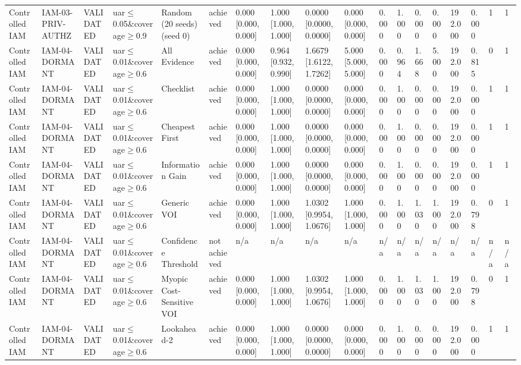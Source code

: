 \begin{table}[!ht]
{\begin{tabular}{llllllllllllllllll}
Controlled IAM & IAM-03-PRIV-AUTHZ & VALIDATED & uar$\le$0.05\&coverage$\ge$0.9 & Random (20 seeds) (seed 0) & achieved & 0.000 [0.000, 0.000] & 1.000 [1.000, 1.000] & 0.0000 [0.0000, 0.0000] & 0.000 [0.000, 0.000] & 0.000 & 1.000 & 0.000 & 0.000 & 192.000 & 0.000 & 1 & 1 \\
Controlled IAM & IAM-04-DORMANT & VALIDATED & uar$\le$0.01\&coverage$\ge$0.6 & All Evidence & achieved & 0.000 [0.000, 0.000] & 0.964 [0.932, 0.990] & 1.6679 [1.6122, 1.7262] & 5.000 [5.000, 5.000] & 0.000 & 0.964 & 1.668 & 5.000 & 192.000 & 0.815 & 0 & 1 \\
Controlled IAM & IAM-04-DORMANT & VALIDATED & uar$\le$0.01\&coverage$\ge$0.6 & Checklist & achieved & 0.000 [0.000, 0.000] & 1.000 [1.000, 1.000] & 0.0000 [0.0000, 0.0000] & 0.000 [0.000, 0.000] & 0.000 & 1.000 & 0.000 & 0.000 & 192.000 & 0.000 & 1 & 1 \\
Controlled IAM & IAM-04-DORMANT & VALIDATED & uar$\le$0.01\&coverage$\ge$0.6 & Cheapest First & achieved & 0.000 [0.000, 0.000] & 1.000 [1.000, 1.000] & 0.0000 [0.0000, 0.0000] & 0.000 [0.000, 0.000] & 0.000 & 1.000 & 0.000 & 0.000 & 192.000 & 0.000 & 1 & 1 \\
Controlled IAM & IAM-04-DORMANT & VALIDATED & uar$\le$0.01\&coverage$\ge$0.6 & Information Gain & achieved & 0.000 [0.000, 0.000] & 1.000 [1.000, 1.000] & 0.0000 [0.0000, 0.0000] & 0.000 [0.000, 0.000] & 0.000 & 1.000 & 0.000 & 0.000 & 192.000 & 0.000 & 1 & 1 \\
Controlled IAM & IAM-04-DORMANT & VALIDATED & uar$\le$0.01\&coverage$\ge$0.6 & Generic VOI & achieved & 0.000 [0.000, 0.000] & 1.000 [1.000, 1.000] & 1.0302 [0.9954, 1.0676] & 1.000 [1.000, 1.000] & 0.000 & 1.000 & 1.030 & 1.000 & 192.000 & 0.798 & 0 & 1 \\
Controlled IAM & IAM-04-DORMANT & VALIDATED & uar$\le$0.01\&coverage$\ge$0.6 & Confidence Threshold & not achieved & n/a & n/a & n/a & n/a & n/a & n/a & n/a & n/a & n/a & n/a & n/a & n/a \\
Controlled IAM & IAM-04-DORMANT & VALIDATED & uar$\le$0.01\&coverage$\ge$0.6 & Myopic Cost-Sensitive VOI & achieved & 0.000 [0.000, 0.000] & 1.000 [1.000, 1.000] & 1.0302 [0.9954, 1.0676] & 1.000 [1.000, 1.000] & 0.000 & 1.000 & 1.030 & 1.000 & 192.000 & 0.798 & 0 & 1 \\
Controlled IAM & IAM-04-DORMANT & VALIDATED & uar$\le$0.01\&coverage$\ge$0.6 & Lookahead-2 & achieved & 0.000 [0.000, 0.000] & 1.000 [1.000, 1.000] & 0.0000 [0.0000, 0.0000] & 0.000 [0.000, 0.000] & 0.000 & 1.000 & 0.000 & 0.000 & 192.000 & 0.000 & 1 & 1 \\

\end{tabular}}
\end{table}
